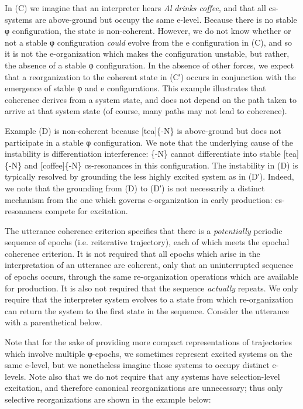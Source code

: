   In (C) we imagine that an interpreter hears \textit{Al} \textit{drinks} \textit{coffee}, and that all cs-systems are above-ground but occupy the same e-level. Because there is no stable φ configuration, the state is non-coherent. However, we do not know whether or not a stable φ configuration \textit{could} evolve from the e configuration in (C), and so it is not the e-organization which makes the configuration unstable, but rather, the absence of a stable φ configuration. In the absence of other forces, we expect that a reorganization to the coherent state in (C′) occurs in conjunction with the emergence of stable φ and e configurations. This example illustrates that coherence derives from a system state, and does not depend on the path taken to arrive at that system state (of course, many paths may not lead to coherence). 

  Example (D) is non-coherent because [tea]\{-N\} is above-ground but does not participate in a stable φ configuration. We note that the underlying cause of the instability is differentiation interference: \{-N\} cannot differentiate into stable [tea]\{-N\} and [coffee]\{-N\} cs-resonances in this configuration. The instability in (D) is typically resolved by grounding the less highly excited system as in (D′). Indeed, we note that the grounding from (D) to (D′) is not necessarily a distinct mechanism from the one which governs e-organization in early production: cs-resonances compete for excitation.

The utterance coherence criterion specifies that there is a \textit{potentially} periodic sequence of epochs (i.e. reiterative trajectory), each of which meets the epochal coherence criterion. It is not required that all epochs which arise in the interpretation of an utterance are coherent, only that an uninterrupted sequence of epochs occurs, through the same re-organization operations which are available for production. It is also not required that the sequence \textit{actually} repeats. We only require that the interpreter system evolves to a state from which re-organization can return the system to the first state in the sequence. Consider the utterance with a parenthetical below. 

  Note that for the sake of providing more compact representations of trajectories which involve multiple φ-epochs, we sometimes represent excited systems on the same e-level, but we nonetheless imagine those systems to occupy distinct e-levels. Note also that we do not require that any systems have selection-level excitation, and therefore canonical reorganizations are unnecessary; thus only selective reorganizations are shown in the example below:

